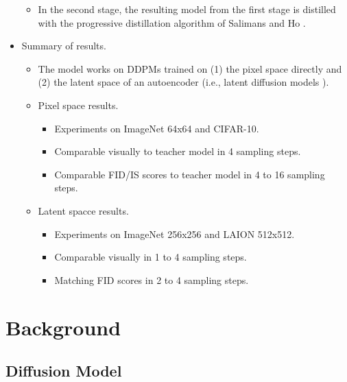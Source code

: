 \documentclass[10pt]{article}
\begin{document}
\begin{itemize}
\begin{itemize}
    \item In the second stage, the resulting model from the first stage is distilled with the progressive distillation algorithm of Salimans and Ho \cite{Salimans:2022}.
  \end{itemize}

  \item Summary of results.
  \begin{itemize}
    \item The model works on DDPMs trained on (1) the pixel space directly and (2) the latent space of an autoencoder (i.e., latent diffusion models \cite{Rombach:2021}).
    
    \item Pixel space results.
    \begin{itemize}
      \item Experiments on ImageNet 64x64 and CIFAR-10.
      \item Comparable visually to teacher model in 4 sampling steps.
      \item Comparable FID/IS scores to teacher model in 4 to 16 sampling steps.      
    \end{itemize}
    
    \item Latent spacce results.
    \begin{itemize}
      \item Experiments on ImageNet 256x256 and LAION 512x512.
      \item Comparable visually in 1 to 4 sampling steps.
      \item Matching FID scores in 2 to 4 sampling steps.
    \end{itemize}
  \end{itemize}
\end{itemize}

\section{Background}

\subsection{Diffusion Model}
\end{document}

